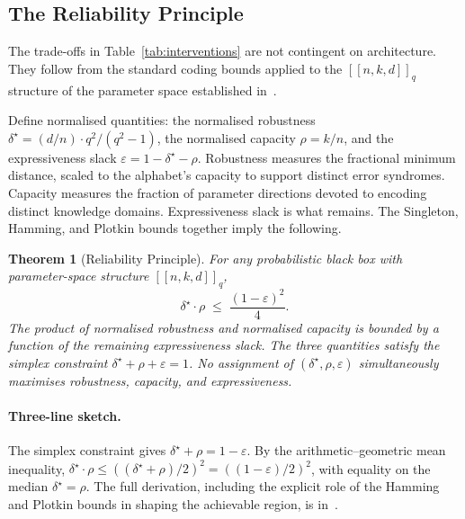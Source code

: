 \documentclass[11pt,a4paper]{article}
\newtheorem{theorem}{Theorem}[section]
\begin{document}
\subsection{The Reliability Principle}
\label{sec:pipeline-rp}

The trade-offs in Table~\ref{tab:interventions} are not contingent on architecture. They follow from the standard coding bounds applied to the $[\![n, k, d]\!]_q$ structure of the parameter space established in~\cite{SyndromeAlgebra}.

Define normalised quantities: the normalised robustness $\delta^\star =
(d/n) \cdot q^2 / (q^2 - 1)$, the normalised capacity $\rho = k/n$, and the expressiveness slack $\varepsilon = 1 - \delta^\star - \rho$. Robustness measures the fractional minimum distance, scaled to the alphabet's capacity to support distinct error syndromes. Capacity measures the fraction of parameter directions devoted to encoding distinct knowledge domains. Expressiveness slack is what remains. The Singleton, Hamming, and Plotkin bounds together imply the following.

\begin{theorem}[Reliability Principle]
\label{thm:rp}
For any probabilistic black box with parameter-space structure $[\![n, k, d]\!]_q$,
\begin{equation}
\label{eq:rp}
   \delta^\star \cdot \rho \;\leq\; \frac{(1 - \varepsilon)^2}{4}.
\end{equation}
The product of normalised robustness and normalised capacity is bounded by a function of the remaining expressiveness slack. The three quantities satisfy the simplex constraint $\delta^\star + \rho + \varepsilon = 1$. No assignment of $(\delta^\star, \rho, \varepsilon)$ simultaneously maximises robustness, capacity, and expressiveness.
\end{theorem}

\paragraph{Three-line sketch.} The simplex constraint gives $\delta^\star
+ \rho = 1 - \varepsilon$. By the arithmetic--geometric mean inequality, $\delta^\star \cdot \rho \leq ((\delta^\star + \rho)/2)^2 = ((1 - \varepsilon)/2)^2$, with equality on the median $\delta^\star = \rho$. The full derivation, including the explicit role of the Hamming and Plotkin bounds in shaping the achievable region, is in~\cite{SyndromeAlgebra}.
\end{document}
